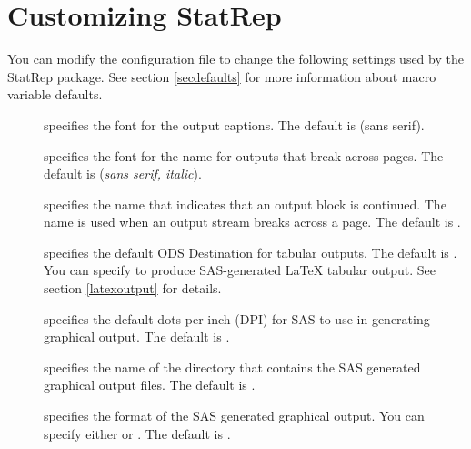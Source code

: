 \documentclass[article,oneside]{memoir}
\newcommand*{\StatRep}{\textsf{StatRep}\xspace}
\begin{document}
 \section{Customizing \StatRep}\label{custom}

  You can modify the configuration file  to change
the following settings used by the \StatRep package.
  See section \ref{secdefaults} for more information about macro variable defaults.

    \begin{description}
     \item[] specifies the font for the output captions.
     The default is  (\textsf{sans serif}).

     \item[] specifies the font for the  name
     for outputs that break across pages.
     The default is  (\textsf{\textit{sans serif, italic}}).

     \item[] specifies the name that indicates that an output
     block is continued. The name is used when an output stream breaks across a page.
     The default is .

    \item[] specifies the default ODS Destination for tabular
    outputs. The default is . You can specify  to produce
    SAS-generated LaTeX tabular output. See section \ref{latexoutput} for details.

    \item[] specifies the default dots per inch (DPI) for SAS to use in generating
    graphical output. The default is .

    \item[] specifies the name of the directory that contains the SAS
     generated graphical output files. The default is .

    \item[] specifies the format of the SAS
     generated graphical output. You can specify either
      or . The default is .


\end{description}
\end{document}

